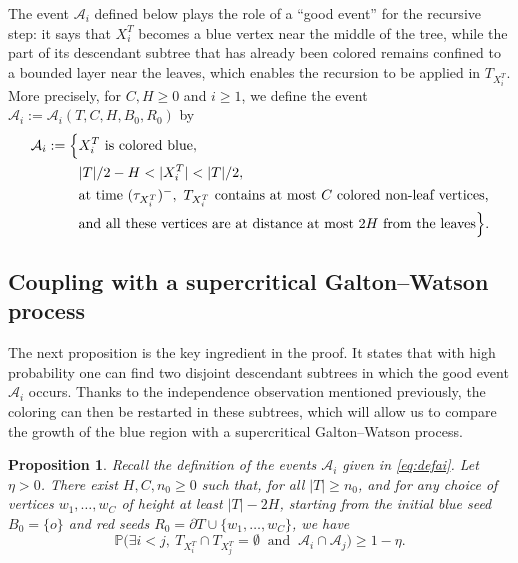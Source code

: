 \documentclass[french]{article}
\newtheorem{prop}[theorem]{Proposition}
\renewcommand{\P}{\mathbb{P}}
\newcommand{\Tf}{T}
\renewcommand{\1}{\mathds{1}}
\begin{document}
\medskip

The event $\mathcal{A}_i$ defined below plays the role of a ``good event'' for the recursive step: it says that $X_i^{\Tf}$ becomes a blue vertex near the middle of the tree, while the part of its descendant subtree that has already been colored remains confined to a bounded layer near the leaves, which enables the recursion to be applied in $\Tf_{X_i^{\Tf}}$. More precisely, for $C,H\ge 0$ and $i\ge 1$, we define the event $\mathcal{A}_i:=\mathcal{A}_i(\Tf,C,H,B_0,R_0)$ by
\begin{equation}\label{eq:defai}
\begin{aligned}
\mathcal{A}_i := \Bigl\{&
X^{\Tf}_i \text{ is colored blue},\\
& |\Tf|/2 - H < |X^{\Tf}_i| < |\Tf|/2,\\
& \text{at time }(\tau_{X^{\Tf}_i})^{-},\ 
\Tf_{X^{\Tf}_i} \text{ contains at most } C \text{ colored non-leaf vertices,}\\
& \text{and all these vertices are at distance at most } 2H \text{ from the leaves}
\Bigr\}.
\end{aligned}
\end{equation}

\subsection{Coupling with a supercritical Galton--Watson process}

The next proposition is the key ingredient in the proof. It states that with high probability one can find two disjoint descendant subtrees in which the good event $\mathcal{A}_i$ occurs. Thanks to the independence observation mentioned previously, the coloring can then be restarted in these subtrees, which will allow us to compare the growth of the blue region with a supercritical Galton--Watson process.

\begin{prop}\label{prop:main}
Recall the definition of the events $\mathcal{A}_i$ given in \eqref{eq:defai}.
Let $\eta>0$. There exist $H,C,n_0\ge 0$ such that, for all $|\Tf|\ge n_0$, and for any choice of vertices $w_1,\ldots,w_C$ of height at least $|\Tf|-2H$, starting from the initial blue seed $B_0=\{o\}$ and red seeds $R_0=\partial \Tf \cup\{w_1,\ldots,w_C\}$, we have
\begin{equation}\label{eq1}
\P\bigl(\exists i<j,\ \Tf_{X^{\Tf}_i}\cap \Tf_{X^{\Tf}_j}=\emptyset \ \text{ and }\ \mathcal{A}_i\cap \mathcal{A}_j\bigr)\ge 1-\eta.
\end{equation}
\end{prop}
\end{document}
